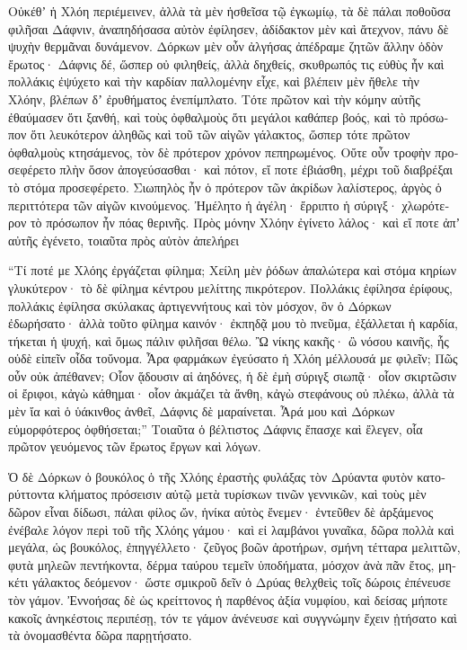 \documentclass{book}
\begin{document}
\begin{pairs}
\begin{Leftside}
\begin{greek}
  Οὐκέθʼ ἡ Χλόη περιέμεινεν, ἀλλὰ τὰ μὲν ἡσθεῖσα τῷ ἐγκωμίῳ, τὰ δὲ πάλαι ποθοῦσα φιλῆσαι Δάφνιν, ἀναπηδήσασα αὐτὸν ἐφίλησεν, ἀδίδακτον μὲν καὶ ἄτεχνον, πάνυ δὲ ψυχὴν θερμᾶναι δυνάμενον.  Δόρκων μὲν οὖν ἀλγήσας ἀπέδραμε ζητῶν ἄλλην ὁδὸν ἔρωτος· Δάφνις δέ, ὥσπερ οὐ φιληθείς, ἀλλὰ δηχθείς, σκυθρωπός τις εὐθὺς ἦν καὶ πολλάκις ἐψύχετο καὶ τὴν καρδίαν παλλομένην εἶχε, καὶ βλέπειν μὲν ἤθελε τὴν Χλόην, βλέπων δʼ ἐρυθήματος ἐνεπίμπλατο.  Τότε πρῶτον καὶ τὴν κόμην αὐτῆς ἐθαύμασεν ὅτι ξανθή, καὶ τοὺς ὀφθαλμοὺς ὅτι μεγάλοι καθάπερ βοός, καὶ τὸ πρόσωπον ὅτι λευκότερον ἀληθῶς καὶ τοῦ τῶν αἰγῶν γάλακτος, ὥσπερ τότε πρῶτον ὀφθαλμοὺς κτησάμενος, τὸν δὲ πρότερον χρόνον πεπηρωμένος.  Οὔτε οὖν τροφὴν προσεφέρετο πλὴν ὅσον ἀπογεύσασθαι· καὶ πότον, εἴ ποτε ἐβιάσθη, μέχρι τοῦ διαβρέξαι τὸ στόμα προσεφέρετο. Σιωπηλὸς ἦν ὁ πρότερον τῶν ἀκρίδων λαλίστερος, ἀργὸς ὁ περιττότερα τῶν αἰγῶν κινούμενος. Ἠμέλητο ἡ ἀγέλη· ἔρριπτο ἡ σύριγξ· χλωρότερον τὸ πρόσωπον ἦν πόας θερινῆς. Πρὸς μόνην Χλόην ἐγίνετο λάλος· καὶ εἴ ποτε ἀπʼ αὐτῆς ἐγένετο, τοιαῦτα πρὸς αὑτὸν ἀπελήρει
\pend


  “Τί ποτέ με Χλόης ἐργάζεται φίλημα; Χείλη μὲν ῥόδων ἁπαλώτερα καὶ στόμα κηρίων γλυκύτερον· τὸ δὲ φίλημα κέντρου μελίττης πικρότερον. Πολλάκις ἐφίλησα ἐρίφους, πολλάκις ἐφίλησα σκύλακας ἀρτιγεννήτους καὶ τὸν μόσχον, ὃν ὁ Δόρκων ἐδωρήσατο· ἀλλὰ τοῦτο φίλημα καινόν· ἐκπηδᾷ μου τὸ πνεῦμα, ἐξάλλεται ἡ καρδία, τήκεται ἡ ψυχή, καὶ ὅμως πάλιν φιλῆσαι θέλω.  Ὢ νίκης κακῆς· ὢ νόσου καινῆς, ἧς οὐδὲ εἰπεῖν οἶδα τοὔνομα. Ἆρα φαρμάκων ἐγεύσατο ἡ Χλόη μέλλουσά με φιλεῖν; Πῶς οὖν οὐκ ἀπέθανεν; Οἷον ᾅδουσιν αἱ ἀηδόνες, ἡ δὲ ἐμὴ σύριγξ σιωπᾷ· οἷον σκιρτῶσιν οἱ ἔριφοι, κἀγὼ κάθημαι· οἷον ἀκμάζει τὰ ἄνθη, κἀγὼ στεφάνους οὐ πλέκω, ἀλλὰ τὰ μὲν ἴα καὶ ὁ ὑάκινθος ἀνθεῖ, Δάφνις δὲ μαραίνεται.  Ἆρά μου καὶ Δόρκων εὐμορφότερος ὀφθήσεται;” Τοιαῦτα ὁ βέλτιστος Δάφνις ἔπασχε καὶ ἔλεγεν, οἷα πρῶτον γευόμενος τῶν ἔρωτος ἔργων καὶ λόγων.
\pend


  Ὁ δὲ Δόρκων ὁ βουκόλος ὁ τῆς Χλόης ἐραστὴς φυλάξας τὸν Δρύαντα φυτὸν κατορύττοντα κλήματος πρόσεισιν αὐτῷ μετὰ τυρίσκων τινῶν γεννικῶν, καὶ τοὺς μὲν δῶρον εἶναι δίδωσι, πάλαι φίλος ὤν, ἡνίκα αὐτὸς ἔνεμεν· ἐντεῦθεν δὲ ἀρξάμενος ἐνέβαλε λόγον περὶ τοῦ τῆς Χλόης γάμου·  καὶ εἰ λαμβάνοι γυναῖκα, δῶρα πολλὰ καὶ μεγάλα, ὡς βουκόλος, ἐπηγγέλλετο· ζεῦγος βοῶν ἀροτήρων, σμήνη τέτταρα μελιττῶν, φυτὰ μηλεῶν πεντήκοντα, δέρμα ταύρου τεμεῖν ὑποδήματα, μόσχον ἀνὰ πᾶν ἔτος, μηκέτι γάλακτος δεόμενον·  ὥστε σμικροῦ δεῖν ὁ Δρύας θελχθεὶς τοῖς δώροις ἐπένευσε τὸν γάμον. Ἐννοήσας δὲ ὡς κρείττονος ἡ παρθένος ἀξία νυμφίου, καὶ δείσας μήποτε κακοῖς ἀνηκέστοις περιπέσῃ, τόν τε γάμον ἀνένευσε καὶ συγγνώμην ἔχειν ᾐτήσατο καὶ τὰ ὀνομασθέντα δῶρα παρῃτήσατο.
\pend



\end{greek}
\end{Leftside}
\end{pairs}
\end{document}
